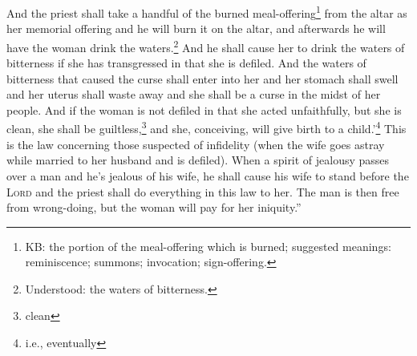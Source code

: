 \begin{inparaenum}
     And the priest shall take a handful of the burned meal-offering\footnote{KB: the portion of the meal-offering which is burned; suggested meanings: reminiscence; summons; invocation; sign-offering.} from the altar as her memorial offering and he will burn it on the altar, and afterwards he will have the woman drink the waters.\footnote{Understood: the waters of bitterness.}%
     And he shall cause her to drink the waters of bitterness if she has transgressed in that she is defiled. And the waters of bitterness that caused the curse shall enter into her and her stomach shall swell and her uterus shall waste away and she shall be a curse in the midst of her people.%
     And if the woman is not defiled in that she acted unfaithfully, but she is clean, she shall be guiltless,\footnote{clean} and she, conceiving, will give birth to a child.'\footnote{i.e., eventually}%
     This is the law concerning those suspected of infidelity (when the wife goes astray while married to her husband and is defiled).%
     When a spirit of jealousy passes over a man and he's jealous of his wife, he shall cause his wife to stand before the \textsc{Lord} and the priest shall do everything in this law to her.%
     The man is then free from wrong-doing, but the woman will pay for her iniquity.''%
\end{inparaenum}
